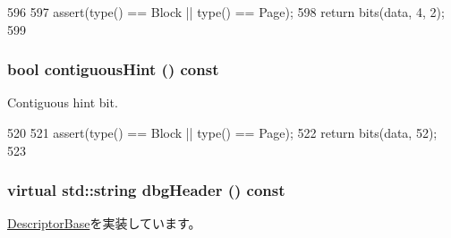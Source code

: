 \begin{DoxyCode}
596         {
597             assert(type() == Block || type() == Page);
598             return bits(data, 4, 2);
599         }
\end{DoxyCode}
\hypertarget{classArmISA_1_1TableWalker_1_1LongDescriptor_a2dab8ca48cab365e5e6b7b75e34996cc}{
\subsubsection[{contiguousHint}]{\setlength{\rightskip}{0pt plus 5cm}bool contiguousHint () const}}
\label{classArmISA_1_1TableWalker_1_1LongDescriptor_a2dab8ca48cab365e5e6b7b75e34996cc}
Contiguous hint bit. 


\begin{DoxyCode}
520         {
521             assert(type() == Block || type() == Page);
522             return bits(data, 52);
523         }
\end{DoxyCode}
\hypertarget{classArmISA_1_1TableWalker_1_1LongDescriptor_ac7721f9b49eadf35e0a9f7715a346dbe}{
\subsubsection[{dbgHeader}]{\setlength{\rightskip}{0pt plus 5cm}virtual std::string dbgHeader () const}}
\label{classArmISA_1_1TableWalker_1_1LongDescriptor_ac7721f9b49eadf35e0a9f7715a346dbe}


\hyperlink{classArmISA_1_1TableWalker_1_1DescriptorBase_a16f3fe8786507522f0f0298cb6c414f1}{DescriptorBase}を実装しています。


